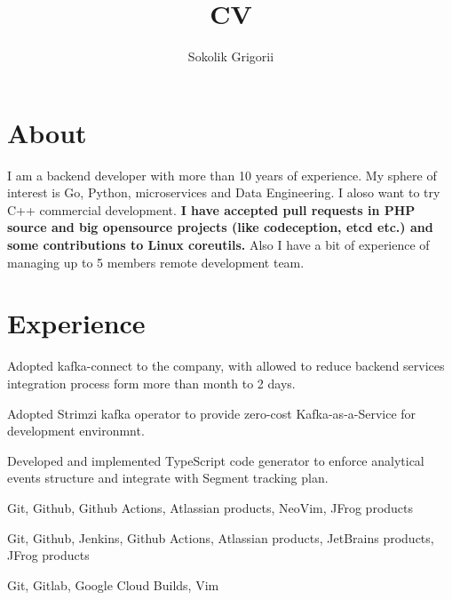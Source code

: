 \documentclass{cv}
\title {CV}
\author{Sokolik Grigorii}
\begin{document}
\maketitle

\section* {About}
I am a backend developer with more than 10 years of experience. My sphere of
interest is Go, Python, microservices and Data Engineering. I aloso want to
try C++ commercial development. \textbf{I have accepted pull requests in PHP
source and big opensource projects (like codeception, etcd etc.) and some
contributions to Linux coreutils.} Also I have a bit of experience of
managing up to 5 members remote development team.


\section* {Experience}
    \begin{gaas}
      \item Adopted kafka-connect to the company, with allowed to reduce
        backend services integration process form more than month to 2 days.
      \item Adopted Strimzi kafka operator to provide zero-cost
        Kafka-as-a-Service for development environmnt.
      \item Developed and implemented TypeScript code generator to enforce
        analytical events structure and integrate with Segment tracking plan.
    \end{gaas}
    \devtools
      Git, Github, Github Actions, Atlassian products, NeoVim, JFrog products

    \devtools
      Git, Github, Jenkins, Github Actions, Atlassian products, JetBrains
      products, JFrog products

    \devtools
      Git, Gitlab, Google Cloud Builds, Vim
\end{document}
